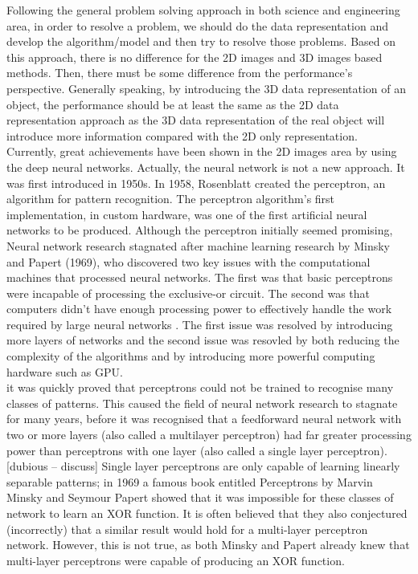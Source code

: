 \documentclass[a4paper,12pt]{article}
\begin{document}
Following the general problem solving approach in both science and engineering area, in order to resolve a problem, we should do the data representation and develop the algorithm/model and then try to resolve those problems. Based on this approach, there is no difference for the 2D images and 3D images based methods. Then, there must be some difference from the performance's perspective. Generally speaking, by introducing the 3D data representation of an object, the performance should be at least the same as the 2D data representation approach as the 3D data representation of the real object will introduce more information compared with the 2D only representation.\\
Currently, great achievements have been shown in the 2D images area by using the deep neural networks. Actually, the neural network is not a new approach. It was first introduced in 1950s. In 1958, Rosenblatt\cite{Rosenblatt} created the perceptron, an algorithm for pattern recognition.  The perceptron algorithm's first implementation, in custom hardware, was one of the first artificial neural networks to be produced. Although the perceptron initially seemed promising, Neural network research stagnated after machine learning research by Minsky and Papert (1969)\cite{Minsky}, who discovered two key issues with the computational machines that processed neural networks. The first was that basic perceptrons were incapable of processing the exclusive-or circuit. The second was that computers didn't have enough processing power to effectively handle the work required by large neural networks
\cite{ann}. The first issue was resolved by introducing more layers of networks and the second issue was resovled by both reducing the complexity of the algorithms and by introducing more powerful computing hardware such as GPU.\\
 


 it was quickly proved that perceptrons could not be trained to recognise many classes of patterns. This caused the field of neural network research to stagnate for many years, before it was recognised that a feedforward neural network with two or more layers (also called a multilayer perceptron) had far greater processing power than perceptrons with one layer (also called a single layer perceptron).[dubious – discuss] Single layer perceptrons are only capable of learning linearly separable patterns; in 1969 a famous book entitled Perceptrons by Marvin Minsky and Seymour Papert showed that it was impossible for these classes of network to learn an XOR function. It is often believed that they also conjectured (incorrectly) that a similar result would hold for a multi-layer perceptron network. However, this is not true, as both Minsky and Papert already knew that multi-layer perceptrons were capable of producing an XOR function. 
\end{document}
